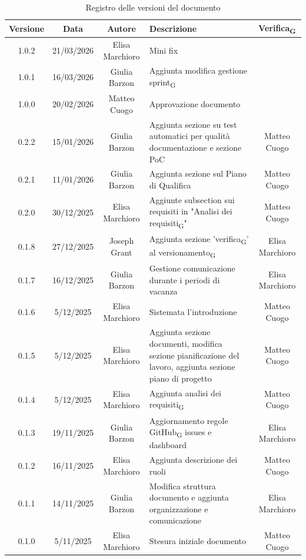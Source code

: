 \documentclass[11pt,a4paper]{article}
\newcommand{\gls}[1]{#1\textsubscript{G}}
\begin{document}
\begin{table}[H]
    \centering
    \begin{tabular}{|c|c|c|>{\raggedright\arraybackslash}p{}|c|}
        \hline
        \textbf{Versione} & \textbf{Data} & \textbf{Autore} & \textbf{Descrizione} & \textbf{\gls{Verifica}} \\
        \hline
        1.0.2 & 21/03/2026 & Elisa Marchioro & Mini fix & \\
        \hline
        1.0.1 & 16/03/2026 & Giulia Barzon & Aggiunta modifica gestione \gls{sprint} & \\
        \hline
        1.0.0 & 20/02/2026 & Matteo Cuogo & Approvazione documento & \\
        \hline
        0.2.2 & 15/01/2026 & Giulia Barzon & Aggiunta sezione su test automatici per qualità documentazione e sezione PoC & Matteo Cuogo\\
        \hline
        0.2.1 & 11/01/2026 & Giulia Barzon & Aggiunta sezione sul Piano di Qualifica & Matteo Cuogo\\
        \hline
        0.2.0 & 30/12/2025 & Elisa Marchioro & Aggiunte subsection sui requisiti in "\gls{Analisi dei requisiti}" & Matteo Cuogo\\ 
        \hline
        0.1.8 & 27/12/2025 & Joseph Grant & Aggiunta sezione '\gls{verifica}' al \gls{versionamento} & Elisa Marchioro\\ 
        \hline
        0.1.7 & 16/12/2025 & Giulia Barzon & Gestione comunicazione durante i periodi di vacanza & Elisa Marchioro\\
        \hline
        0.1.6 & 5/12/2025 & Elisa Marchioro & Sistemata l'introduzione & Matteo Cuogo\\
        \hline
        0.1.5 & 5/12/2025 & Elisa Marchioro & Aggiunta sezione documenti, modifica sezione pianificazione del lavoro, aggiunta sezione piano di progetto & Matteo Cuogo\\
        \hline
        0.1.4 & 5/12/2025 & Elisa Marchioro & Aggiunta \gls{analisi dei requisiti} & Matteo Cuogo\\
        \hline
        0.1.3 & 19/11/2025 & Giulia Barzon & Aggiornamento regole \gls{GitHub} issues e dashboard & Elisa Marchioro\\
        \hline
        0.1.2 & 16/11/2025 & Elisa Marchioro & Aggiunta descrizione dei ruoli & Matteo Cuogo\\
        \hline
        0.1.1 & 14/11/2025 & Giulia Barzon & Modifica struttura documento e aggiunta organizzazione e comunicazione & Elisa Marchioro\\
        \hline
        0.1.0 & 5/11/2025 & Elisa Marchioro & Stesura iniziale documento & Matteo Cuogo \\
        \hline
    \end{tabular}
    \caption{Registro delle versioni del documento}
    \label{tab:versionamento}
\end{table}
\end{document}
